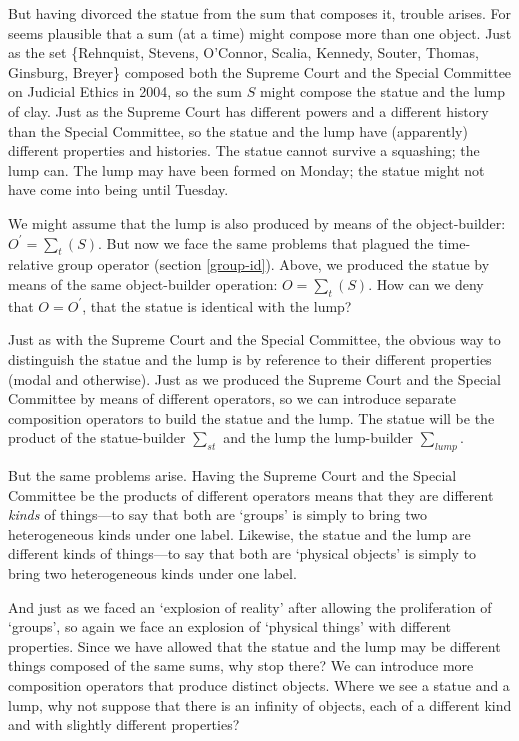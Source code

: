 \documentclass[11pt]{article}
\begin{document}
\begin{spacing}{1.5}
But having divorced the statue from the sum that composes it, trouble
arises.  For seems plausible that a sum (at a time) might compose more
than one object.  Just as the set \{Rehnquist, Stevens, O'Connor,
Scalia, Kennedy, Souter, Thomas, Ginsburg, Breyer\} composed both the
Supreme Court and the Special Committee on Judicial Ethics in 2004, so
the sum $S$ might compose the statue and the lump of clay.  Just as
the Supreme Court has different powers and a different history than
the Special Committee, so the statue and the lump have (apparently)
different properties and histories.  The statue cannot survive a
squashing; the lump can.  The lump may have been formed on Monday; the
statue might not have come into being until Tuesday.

We might assume that the lump is also produced by means of the
object-builder: $O^{\prime} = \sum _{t} ( S )$.  But now we face the
same problems that plagued the time-relative group operator (section
\ref{group-id}).  Above, we produced the statue by means of the same
object-builder operation: $O = \sum _{t} ( S )$.  How can we deny that
$O = O^{\prime}$, that the statue is identical with the lump?

Just as with the Supreme Court and the Special Committee, the obvious
way to distinguish the statue and the lump is by reference to their
different properties (modal and otherwise).  Just as we produced the
Supreme Court and the Special Committee by means of different
operators, so we can introduce separate composition operators to build
the statue and the lump.  The statue will be the product of the
statue-builder $\sum _{st}$ and the lump the lump-builder $\sum
_{lump}$.

But the same problems arise.  Having the Supreme Court and the Special
Committee be the products of different operators means that they are
different {\em kinds} of things---to say that both are `groups' is
simply to bring two heterogeneous kinds under one label.  Likewise, the
statue and the lump are different kinds of things---to say that both
are `physical objects' is simply to bring two heterogeneous kinds
under one label.

And just as we faced an `explosion of reality' after allowing the
proliferation of `groups', so again we face an explosion of `physical
things' with different properties.  Since we have allowed that the
statue and the lump may be different things composed of the same sums,
why stop there?  We can introduce more composition operators that
produce distinct objects.  Where we see a statue and a lump, why not
suppose that there is an infinity of objects, each of a different kind
and with slightly different properties?


\end{spacing}
\end{document}
